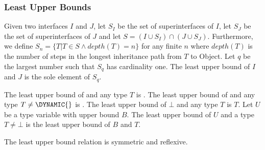 \documentclass{article}
\newcommand{\code}[1]{{\sf #1}}
\begin{document}
\subsubsection{Least Upper Bounds}

\LMHash{}
Given two interfaces $I$ and $J$, let $S_I$ be the set of superinterfaces of $I$,  let $S_J$ be the set of superinterfaces of $J$ and let $S =  (I \cup S_I) \cap (J \cup S_J)$.  Furthermore, we define $S_n = \{T | T \in S  \wedge depth(T) =n\}$ for any finite $n$ %
where $depth(T)$ is the number of steps in the longest inheritance path from $T$ to \code{Object}. Let $q$ be the largest number such that $S_q$ has cardinality one. The least upper bound of $I$ and $J$ is the sole element of  $S_q$.

\LMHash{}
The least upper bound of \DYNAMIC{} and any type $T$ is \DYNAMIC{}.
The least upper bound of \VOID{} and any type $T \ne \DYNAMIC{}$ is \VOID{}.
The least upper bound of $\bot$ and any type $T$ is $T$.
Let $U$ be a type variable with upper bound $B$. The least upper bound of $U$ and a type $T \ne \bot$ is the least upper bound of $B$ and $T$.

\LMHash{}
The least upper bound relation is symmetric and reflexive.

\end{document}
